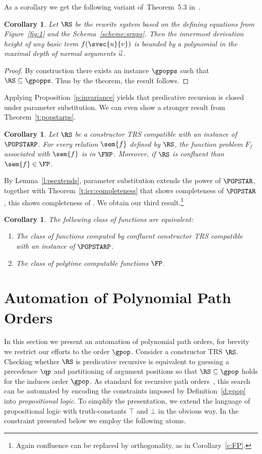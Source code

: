 \documentclass{LMCS}
\newtheorem{corollary}[thm]{Corollary}
\begin{document}
As a corollary we get the following variant of~Theorem~5.3 in~\cite{BW96}.
\begin{corollary}
Let $\RS$ be the rewrite system based on the defining equations from Figure~\ref{fig:1} 
and the Schema~\eqref{scheme:srnps}. Then 
the innermost derivation height of any basic term $f(\svec{u}{v})$ 
is bounded by a polynomial in the maximal depth of normal arguments $\vec{u}$.
\end{corollary}
\begin{proof}
By construction there exists an instance $\gpopps$ such that ${\RS} \subseteq \gpopps$.
Thus by the theorem, the result follows.  
\end{proof}

Applying Proposition~\ref{p:invariance} yields that predicative recursion is closed under parameter substitution.
We can even show a stronger result from Theorem~\ref{t:popstarps}.

\begin{corollary}
  Let $\RS$ be a constructor TRS compatible with an instance of $\POPSTARP$.\@ 
  For every relation $\sem{f}$ defined by $\RS$, 
  the function problem $F_f$ associated with $\sem{f}$ is in $\FNP$.
  Moreover, if $\RS$ is confluent than $\sem{f} \in \FP$.
\end{corollary}

By Lemma~\ref{l:psextends}, parameter substitution extends the power of $\POPSTAR$, 
together with Theorem~\ref{t:icc:completeness} that shows completeness of $\POPSTAR$, 
this shows completeness of \POPSTARP. We obtain our third result.\footnote{Again confluence can be replaced by orthogonality, as in Corollary~\ref{c:FP}.}
\begin{corollary}\label{c:fptime:ps}
  The following class of functions are equivalent:
  \begin{enumerate}[labelsep=*,leftmargin=*]
  \item The class of functions computed by confluent constructor TRS compatible with an instance of $\POPSTARP$. 
  \item The class of polytime computable functions $\FP$. 
  \end{enumerate}
\end{corollary}


\section{Automation of Polynomial Path Orders}\label{s:impl}

In this section we present an automation of polynomial path orders,  
for brevity we restrict our efforts to the order $\gpop$.
Consider a constructor TRS $\RS$. Checking whether $\RS$ is predicative 
recursive is equivalent to guessing a precedence $\qp$ and partitioning 
of argument positions so that $\RS \subseteq {\gpop}$ holds for the induces
order $\gpop$. 
As standard for recursive path orders~\cite{ZM07,SFTGACMZ07},
this search can be automated by encoding the constraints imposed by Definition~\ref{d:gpop}
into \emph{propositional logic}. 
To simplify the presentation, we extend the language of propositional 
logic with truth-constants $\top$ and $\bot$ in the obvious way.
In the constraint presented below we employ the following atoms. 
\end{document}
